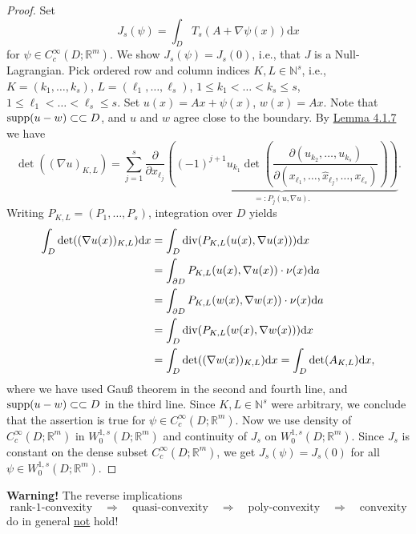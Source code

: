 \begin{proof}
Set
\[J_s(\psi)=\int_D{T_s(A+\nabla\psi(x))\mathrm{d}x}\]
for $\psi\in C_c^\infty(D;\mathbb{R}^m)$. We show $J_s(\psi)=J_s(0)$, i.e., that $J$ is a Null-Lagrangian. Pick ordered row and column indices $K,L\in\mathbb{N}^s$, i.e., $K=(k_1,\dotsc,k_s)$, $L=(\ell_1,\dotsc,\ell_s)$, $1\leq k_1<\dotsc<k_s\leq s$, $1\leq\ell_1<\dotsc<\ell_s\leq s$. Set $u(x)=Ax+\psi(x)$, $w(x)=Ax$. Note that $\operatorname{supp}\mathopen{}\left(u-w\right)\mathclose{}\subset\mathrel\subset D$, and $u$ and $w$ agree close to the boundary. By \hyperlink{lemma_4_1_7}{Lemma 4.1.7} we have
\[\det((\nabla u)_{K,L})=\sum_{j=1}^s{\frac{\partial}{\partial x_{\ell_j}}\underbrace{\left((-1)^{j+1}u_{k_1}\det\left(\frac{\partial(u_{k_2},\dotsc,u_{k_s})}{\partial(x_{\ell_1},\dotsc,\widehat{x}_{\ell_j},\dotsc,x_{\ell_s})}\right)\right)}_{=:P_j(u,\nabla u).}}.\]
Writing $P_{K,L}=(P_1,\dotsc,P_s)$, integration over $D$ yields
\begin{align*}
	\int_D{\det((\nabla u(x))_{K,L})\mathrm{d}x}&=\int_D{\operatorname{div}\mathopen{}\left(P_{K,L}(u(x),\nabla u(x))\right)\mathclose{}\mathrm{d}x}\\
	&=\int_{\partial D}{P_{K,L}(u(x),\nabla u(x))\cdot\nu(x)\mathrm{d}a}\\
	&=\int_{\partial D}{P_{K,L}(w(x),\nabla w(x))\cdot\nu(x)\mathrm{d}a}\\
	&=\int_D{\operatorname{div}\mathopen{}\left(P_{K,L}(w(x),\nabla w(x))\right)\mathclose{}\mathrm{d}x}\\
	&=\int_D{\det((\nabla w(x))_{K,L})\mathrm{d}x}=\int_D{\det(A_{K,L})\mathrm{d}x},
\end{align*}
where we have used Gau{\ss} theorem in the second and fourth line, and $\operatorname{supp}\mathopen{}\left(u-w\right)\mathclose{}\subset\mathrel\subset D$ in the third line. Since $K,L\in\mathbb{N}^s$ were arbitrary, we conclude that the assertion is true for $\psi\in C_c^\infty(D;\mathbb{R}^m)$. Now we use density of $C_c^\infty(D;\mathbb{R}^m)$ in $W_0^{1,s}(D;\mathbb{R}^m)$ and continuity of $J_s$ on $W_0^{1,s}(D;\mathbb{R}^m)$. Since $J_s$ is constant on the dense subset $C_c^\infty(D;\mathbb{R}^m)$, we get $J_s(\psi)=J_s(0)$ for all $\psi\in W_0^{1,s}(D;\mathbb{R}^m)$.
\end{proof}

\textbf{Warning!} The reverse implications
\[\text{rank-1-convexity}\quad\Rightarrow\quad\text{quasi-convexity}\quad\Rightarrow\quad\text{poly-convexity}\quad\Rightarrow\quad\text{convexity}\]
do in general \underline{not} hold!\\[11pt]


